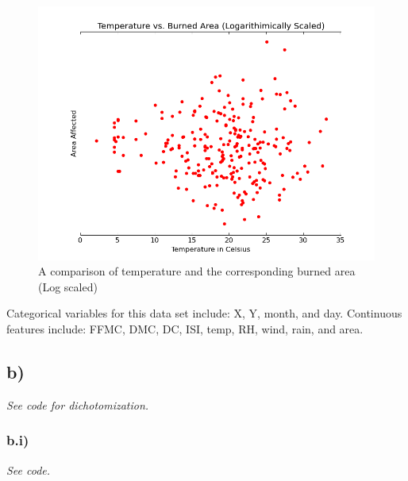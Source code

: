\documentclass[12pt]{article}
\let\Oldsubsection\subsection
\renewcommand{\subsection}{\FloatBarrier\Oldsubsection}
\let\Oldsubsubsection\subsubsection
\renewcommand{\subsubsection}{\FloatBarrier\Oldsubsubsection}
\begin{document}
\begin{figure}[!htb]
\begin{center}
  \includegraphics[scale=0.5]{temperature-area.png}
  \caption{A comparison of temperature and the corresponding burned area (Log scaled)}
\end{center}
\end{figure}

Categorical variables for this data set include: X, Y, month, and day.
Continuous features include: FFMC, DMC, DC, ISI, temp, RH, wind, rain, and area.

\subsection*{b)}
\textit{See code for dichotomization.}
	\subsubsection*{b.i)} 
	\textit{See code.}
\end{document}
